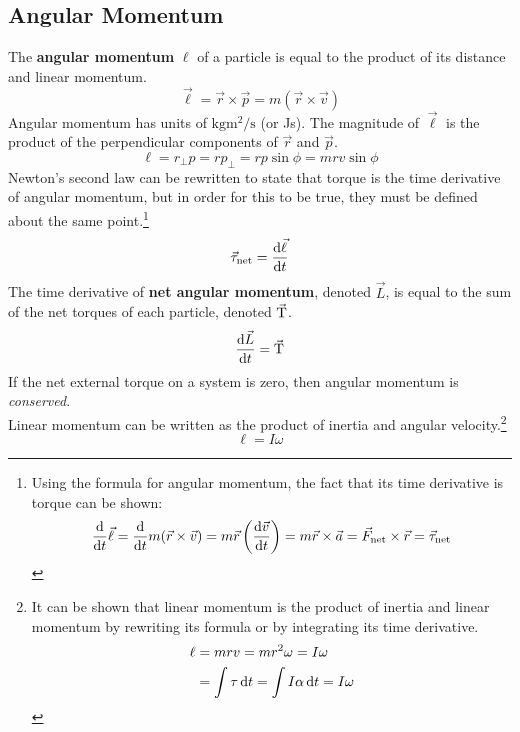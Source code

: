 \documentclass[../AP_Physics_C.tex]{subfiles}
\begin{document}
		\subsection{Angular Momentum}
			The \textbf{angular momentum} $\bm{\ell}$ of a particle is equal to the product of its distance and linear momentum.
			\[\vec{\ell} = \vec{r} \times \vec{p} = m(\vec{r} \times \vec{v})\]
			Angular momentum has units of $\mathrm{kgm^2/s}$ (or Js).
			The magnitude of $\vec{\ell}$ is the product of the perpendicular components of $\vec{r}$ and $\vec{p}$.
			\[\ell = r_\bot p = rp_\bot = rp\sin\phi = mrv\sin\phi\]
			Newton's second law can be rewritten to state that torque is the time derivative of angular momentum, but in order for this to be true, they must be defined about the same point.\footnote{
				Using the formula for angular momentum, the fact that its time derivative is torque can be shown:
				\[\frac{\mathrm{d}}{\mathrm{d} t}\vec{\ell} = \frac{\mathrm{d}}{\mathrm{d} t}m(\vec{r}\times\vec{v}) = m\vec{r}\left(\frac{\mathrm{d}\vec{v}}{\mathrm{d} t}\right) = m\vec{r}\times \vec{a} = \vec{F}_{\operatorname{net}}\times\vec{r} = \vec{\tau}_{\operatorname{net}}\]
			}
			\[\vec{\tau}_{\operatorname{net}} = \frac{\mathrm{d} \vec{\ell}}{\mathrm{d} t}\]
			The time derivative of \textbf{net angular momentum}, denoted $\vec{L}$, is equal to the sum of the net torques of each particle, denoted $\vec{\operatorname{T}}$.
			\[\frac{\mathrm{d}\vec{L}}{\mathrm{d} t} = \vec{\operatorname{T}}\]
			If the net external torque on a system is zero, then angular momentum is \emph{conserved}. \\
			Linear momentum can be written as the product of inertia and angular velocity.\footnote{It can be shown that linear momentum is the product of inertia and linear momentum by rewriting its formula or by integrating its time derivative.\begin{align*}\ell &= mrv = mr^2\omega = I\omega \\ &= \int \tau\,\mathrm{d} t = \int I\alpha\,\mathrm{d} t = I\omega\end{align*}}
			\[\ell = I\omega\]
\end{document}
